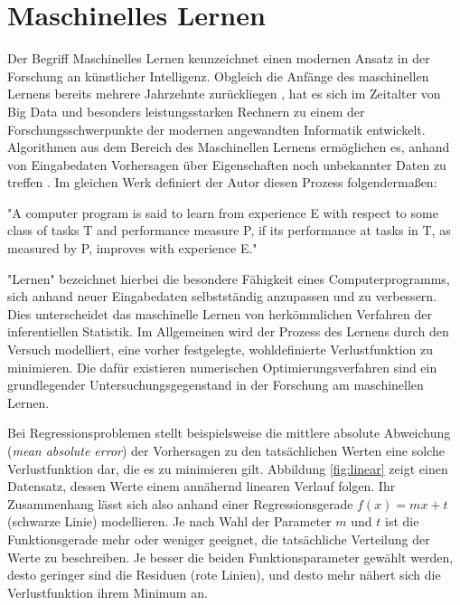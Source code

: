 \section{Maschinelles Lernen}
Der Begriff Maschinelles Lernen kennzeichnet einen modernen Ansatz in der Forschung an künstlicher Intelligenz. Obgleich die Anfänge des maschinellen Lernens bereits mehrere Jahrzehnte zurückliegen \citep{samuelStudiesMachineLearning1959, nilsson1965learning}, hat es sich im Zeitalter von Big Data und besonders leistungsstarken Rechnern zu einem der Forschungsschwerpunkte der modernen angewandten Informatik entwickelt. Algorithmen aus dem Bereich des Maschinellen Lernens ermöglichen es, anhand von Eingabedaten Vorhersagen über Eigenschaften noch unbekannter Daten zu treffen \citep{mitchellMachineLearning1997}. Im gleichen Werk definiert der Autor diesen Prozess folgendermaßen:

\begin{itquote}
    {\foreignlanguage{english}{"A computer program is said to learn from experience E with respect to some class of tasks T and performance measure P, if its performance at tasks in T, as measured by P, improves with experience E."}}
\end{itquote}

"Lernen" bezeichnet hierbei die besondere Fähigkeit eines Computerprogramms, sich anhand neuer Eingabedaten selbstständig anzupassen und zu verbessern. Dies unterscheidet das maschinelle Lernen von herkömmlichen Verfahren der inferentiellen Statistik. Im Allgemeinen wird der Prozess des Lernens durch den Versuch modelliert, eine vorher festgelegte, wohldefinierte Verlustfunktion zu minimieren. %
Die dafür existieren numerischen Optimierungsverfahren sind ein grundlegender Untersuchungsgegenstand in der Forschung am maschinellen Lernen.

Bei Regressionsproblemen stellt beispielsweise die mittlere absolute Abweichung (\textit{mean absolute error}) der Vorhersagen zu den tatsächlichen Werten eine solche Verlustfunktion dar, die es zu minimieren gilt. Abbildung \ref{fig:linear} zeigt einen Datensatz, dessen Werte einem annähernd linearen Verlauf folgen. Ihr Zusammenhang lässt sich also anhand einer Regressionsgerade $f(x) = mx + t$ (schwarze Linie) modellieren. Je nach Wahl der Parameter $m$ und $t$ ist die Funktionsgerade mehr oder weniger geeignet, die tatsächliche Verteilung der Werte zu beschreiben. Je besser die beiden Funktionsparameter gewählt werden, desto geringer sind die Residuen (rote Linien), und desto mehr nähert sich die Verlustfunktion ihrem Minimum an.

